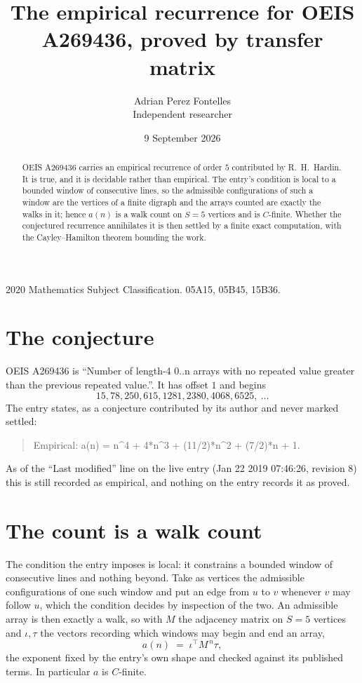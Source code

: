 \documentclass[11pt,a4paper]{article}
\title{The empirical recurrence for OEIS A269436, proved by transfer matrix}
\author{Adrian Perez Fontelles\\ \small Independent researcher}
\date{9 September 2026}
\theoremstyle{plain}
\theoremstyle{definition}
\begin{document}
\maketitle

\begin{abstract}
OEIS A269436 carries an empirical recurrence of order $5$ contributed by R.~H.~Hardin. It is
true, and it is decidable rather than empirical. The entry's condition is local to a bounded window of consecutive lines, so
the admissible configurations of such a window are the vertices of a finite digraph and the
arrays counted are exactly the walks in it; hence $a(n)$ is a walk count on $S=5$ vertices
and is $C$-finite. Whether the conjectured recurrence annihilates it is then settled by a
finite exact computation, with the Cayley--Hamilton theorem bounding the work.
\end{abstract}

\noindent\small 2020 Mathematics Subject Classification. 05A15, 05B45, 15B36.\normalsize

\section{The conjecture}

OEIS A269436 is ``Number of length-4 0..n arrays with no repeated value greater than the previous repeated value.''. It has offset $1$ and begins
\[
15, 78, 250, 615, 1281, 2380, 4068, 6525,\ \dots
\]
The entry states, as a conjecture contributed by its author and never marked settled:
\begin{quote}
Empirical: a(n) = n\^{}4 + 4*n\^{}3 + (11/2)*n\^{}2 + (7/2)*n + 1.
\end{quote}
As of the ``Last modified'' line on the live entry (Jan 22 2019 07:46:26, revision 8) this is still
recorded as empirical, and nothing on the entry records it as proved.

\section{The count is a walk count}

The condition the entry imposes is local: it constrains a bounded window of consecutive lines and nothing beyond. Take as
vertices the admissible configurations of one such window and put an edge from $u$ to $v$
whenever $v$ may follow $u$, which the condition decides by inspection of the two. An
admissible array is then exactly a walk, so with $M$ the adjacency matrix on $S=5$ vertices
and $\iota,\tau$ the vectors recording which windows may begin and end an array,
\[
a(n)\;=\;\iota^{\!\top}M^{\,n}\tau ,
\]
the exponent fixed by the entry's own shape and checked against its published terms. In
particular $a$ is $C$-finite.
\end{document}
